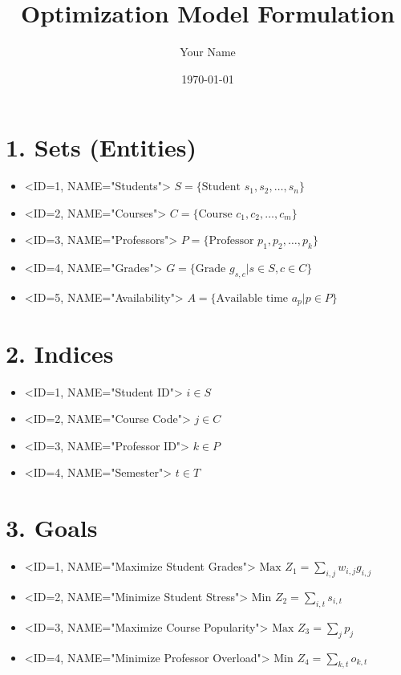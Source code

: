 \documentclass{book}
\title{Optimization Model Formulation}
\author{Your Name}
\date{\today}
\begin{document}
\maketitle

\tableofcontents

\section{1. Sets (Entities)}

\begin{itemize}
    \item <ID=1, NAME="Students">
        $S = \{\text{Student } s_1, s_2, \ldots, s_n\}$
    \item <ID=2, NAME="Courses">
        $C = \{\text{Course } c_1, c_2, \ldots, c_m\}$
    \item <ID=3, NAME="Professors">
        $P = \{\text{Professor } p_1, p_2, \ldots, p_k\}$
    \item <ID=4, NAME="Grades">
        $G = \{\text{Grade } g_{s,c} | s \in S, c \in C\}$
    \item <ID=5, NAME="Availability">
        $A = \{\text{Available time } a_p | p \in P\}$
\end{itemize}

\section{2. Indices}

\begin{itemize}
    \item <ID=1, NAME="Student ID">
        $i \in S$
    \item <ID=2, NAME="Course Code">
        $j \in C$
    \item <ID=3, NAME="Professor ID">
        $k \in P$
    \item <ID=4, NAME="Semester">
        $t \in T$
\end{itemize}

\section{3. Goals}

\begin{itemize}
    \item <ID=1, NAME="Maximize Student Grades">
        $\text{Max } Z_1 = \sum_{i,j} w_{i,j} g_{i,j}$
    \item <ID=2, NAME="Minimize Student Stress">
        $\text{Min } Z_2 = \sum_{i,t} s_{i,t}$
    \item <ID=3, NAME="Maximize Course Popularity">
        $\text{Max } Z_3 = \sum_{j} p_j$
    \item <ID=4, NAME="Minimize Professor Overload">
        $\text{Min } Z_4 = \sum_{k,t} o_{k,t}$
\end{itemize}
\end{document}
